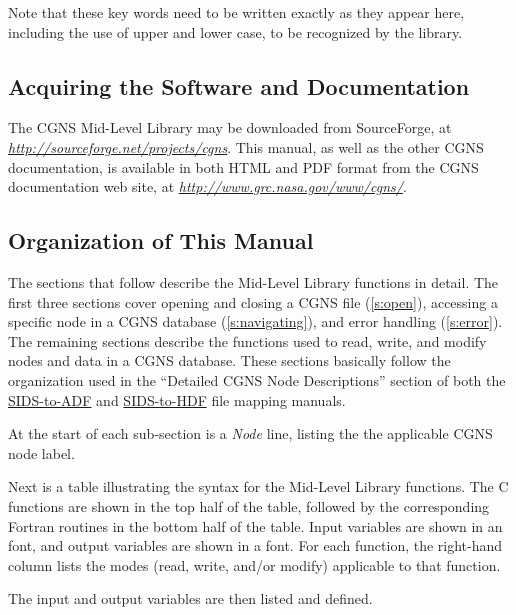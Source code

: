 Note that these key words need to be written exactly as they
appear here, including the use of upper and lower case,
to be recognized by the library.

\subsection{Acquiring the Software and Documentation}

The CGNS Mid-Level Library may be downloaded from SourceForge, at
{\itshape\url{http://sourceforge.net/projects/cgns}}.
This manual, as well as the other CGNS documentation, is available in
both HTML and PDF format from the CGNS documentation web site, at
{\itshape\url{http://www.grc.nasa.gov/www/cgns/}}.

\subsection{Organization of This Manual}

The sections that follow describe the Mid-Level Library functions
in detail.
The first three sections cover opening and closing a CGNS file
(\autoref{s:open}), accessing a specific node in a CGNS database
(\autoref{s:navigating}), and error handling (\autoref{s:error}).
The remaining sections describe the functions used to read, write, and
modify nodes and data in a CGNS database.
These sections basically follow the organization used in
the ``Detailed CGNS Node Descriptions'' section of both the
\href{../filemap/filemap.pdf}{SIDS-to-ADF} and
\href{../filemap_hdf/filemap.pdf}{SIDS-to-HDF} file mapping manuals.

At the start of each sub-section is a \textit{Node} line, listing the
the applicable CGNS node label.

Next is a table illustrating the syntax for the Mid-Level Library
functions.
The C functions are shown in the top half of the table, followed by the
corresponding Fortran routines in the bottom half of the table.
Input variables are shown in an \textcolor{input}{}
font, and output variables are shown in a
\textcolor{output}{} font.
For each function, the right-hand column lists the modes (read, write,
and/or modify) applicable to that function.

The input and output variables are then listed and defined.
